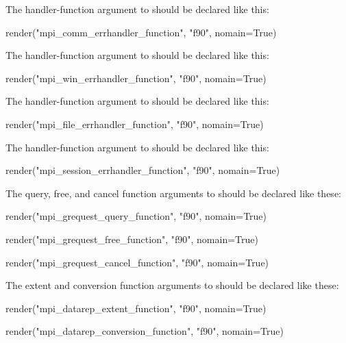 The handler-function argument to 
should be declared like this:

\begin{mpi-binding}
    render("mpi_comm_errhandler_function", "f90", nomain=True)
\end{mpi-binding}

The handler-function argument to 
should be declared like this:

\begin{mpi-binding}
    render("mpi_win_errhandler_function", "f90", nomain=True)
\end{mpi-binding}

The handler-function argument to 
should be declared like this:

\begin{mpi-binding}
    render("mpi_file_errhandler_function", "f90", nomain=True)
\end{mpi-binding}

The handler-function argument to 
should be declared like this:

\begin{mpi-binding}
    render("mpi_session_errhandler_function", "f90", nomain=True)
\end{mpi-binding}

The query, free, and cancel function arguments to 
should be declared like these:

\begin{mpi-binding}
    render("mpi_grequest_query_function", "f90", nomain=True)
\end{mpi-binding}
\begin{mpi-binding}
    render("mpi_grequest_free_function", "f90", nomain=True)
\end{mpi-binding}
\begin{mpi-binding}
    render("mpi_grequest_cancel_function", "f90", nomain=True)
\end{mpi-binding}

The extent and conversion function arguments to 
should be declared like these:

\begin{mpi-binding}
    render("mpi_datarep_extent_function", "f90", nomain=True)
\end{mpi-binding}
\begin{mpi-binding}
    render("mpi_datarep_conversion_function", "f90", nomain=True)
\end{mpi-binding}

